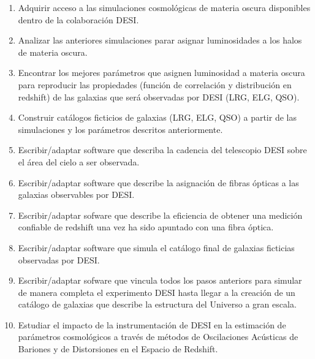 \begin{enumerate}
\item Adquirir acceso a las simulaciones cosmol\'ogicas de materia
  oscura disponibles dentro de la colaboraci\'on DESI.

\item Analizar las anteriores simulaciones parar asignar luminosidades
  a los halos de materia oscura.

\item Encontrar los mejores par\'ametros que asignen luminosidad a
  materia oscura para reproducir las propiedades (funci\'on de
  correlaci\'on y distribuci\'on en redshift) de las galaxias que
  ser\'a observadas por DESI (LRG, ELG, QSO).

\item Construir cat\'alogos ficticios de galaxias (LRG, ELG, QSO) a
  partir de las simulaciones y los par\'ametros descritos
  anteriormente.

\item Escribir/adaptar software que describa la cadencia del
  telescopio DESI sobre el \'area del cielo a ser observada.

\item Escribir/adaptar software que describe la asignaci\'on de fibras
  \'opticas a las galaxias observables por DESI.

\item Escribir/adaptar sofware que describe la eficiencia de obtener
  una medici\'on confiable de redshift una vez ha sido apuntado con
  una fibra \'optica.

\item Escribir/adaptar software que simula el cat\'alogo final de
  galaxias ficticias observadas por DESI.

\item Escribir/adaptar sofware que vincula todos los pasos anteriors
  para simular de manera completa el experimento DESI hasta llegar a
  la creaci\'on de un cat\'alogo de galaxias que describe la
  estructura del Universo a gran escala.

\item Estudiar el impacto de la instrumentaci\'on de DESI en la
  estimaci\'on de par\'ametros cosmol\'ogicos a trav\'es de m\'etodos 
  de Oscilaciones Ac\'usticas de Bariones y de Distorsiones en el
  Espacio de Redshift.
\end{enumerate}


